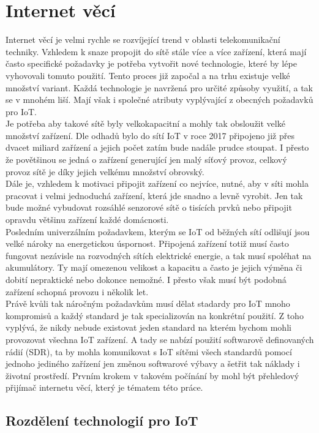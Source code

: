 \documentclass{ctuthesis}
\begin{document}
\chapter{Internet věcí}
Internet věcí je velmi rychle se rozvíjející trend v oblasti telekomunikační techniky. Vzhledem k snaze propojit do sítě stále více a více zařízení, která mají často specifické požadavky je potřeba vytvořit nové technologie, které by lépe vyhovovali tomuto použití. Tento proces již započal a na trhu existuje velké množství variant. 
Každá technologie je navržená pro určité způsoby využití, a tak se v mnohém liší. Mají však i společné atributy vyplývající z obecných požadavků pro IoT.\\
Je potřeba aby takové sítě byly velkokapacitní a mohly tak obsloužit velké množství zařízení. Dle odhadů bylo do sítí IoT v roce 2017 připojeno již přes dvacet miliard zařízení a jejich počet zatím bude nadále prudce stoupat. \cite{statista2018} I přesto že povětšinou se jedná o zařízení generující jen malý síťový provoz, celkový provoz sítě je díky jejich velkému množství obrovský.\\
Dále je, vzhledem k motivaci připojit zařízení co nejvíce, nutné, aby v síti mohla pracovat i velmi jednoduchá zařízení, která jde snadno a levně vyrobit. Jen tak bude možné vybudovat rozsáhlé senzorové sítě o tisících prvků nebo připojit opravdu většinu zařízení každé domácnosti.\\
Posledním univerzálním požadavkem, kterým se IoT od běžných sítí odlišují jsou velké nároky na energetickou úspornost. Připojená zařízení totiž musí často fungovat nezávisle na rozvodných sítích elektrické energie, a tak musí spoléhat na akumulátory. Ty mají omezenou velikost a kapacitu a často je jejich výměna či dobití nepraktické nebo dokonce nemožné. I přesto však musí být podobná zařízení schopná provozu i několik let.
\\
Právě kvůli tak náročným požadavkům musí dělat stadardy pro IoT mnoho kompromisů a každý standard je tak specializován na konkrétní použití. Z toho vyplývá, že nikdy nebude existovat jeden standard na kterém bychom mohli provozovat všechna IoT zařízení. A tady se nabízí použití softwarově definovaných rádií (SDR), ta by mohla komunikovat s IoT sítěmi všech standardů pomocí jednoho jediného zařízení jen změnou softwarové výbavy a šetřit tak náklady i životní prostředí. Prvním krokem v takovém počínání by mohl být přehledový přijímač internetu věcí, který je tématem této práce.

\section{Rozdělení technologií pro IoT}
\end{document}
